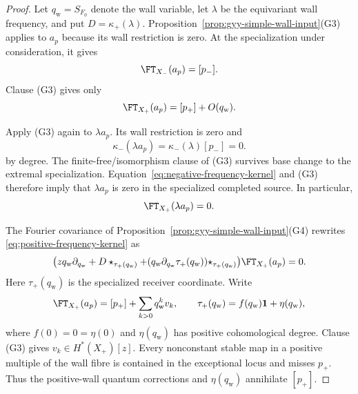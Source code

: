 \begin{proof}
Let \(q_{\mathrm w}=S_{F_0}\) denote the wall variable, let \(\lambda\) be the
equivariant wall frequency, and put \(D=\kappa_+(\lambda)\).
Proposition~\ref{prop:gyy-simple-wall-input}\textup{(G3)} applies to \(a_p\)
because its wall restriction is zero.  At the specialization under
consideration, it gives
\begin{equation}\label{eq:negative-fourier-point}
 \FT_{X_-}(a_p)=[p_-].
\end{equation}
Clause \textup{(G3)} gives only
\begin{equation}\label{eq:positive-fourier-point-tail}
 \FT_{X_+}(a_p)=[p_+]+O(q_{\mathrm w}).
\end{equation}

Apply \textup{(G3)} again to \(\lambda a_p\). Its wall restriction is zero and
\begin{equation}\label{eq:negative-frequency-kernel}
 \kappa_-(\lambda a_p)=\kappa_-(\lambda)[p_-]=0.
\end{equation}
by degree.  The finite-free/isomorphism clause of \textup{(G3)} survives base
change to the extremal specialization.
Equation~\eqref{eq:negative-frequency-kernel} and \textup{(G3)} therefore imply
that \(\lambda a_p\) is zero in the specialized completed source.  In
particular,
\begin{equation}\label{eq:positive-frequency-kernel}
 \FT_{X_+}(\lambda a_p)=0.
\end{equation}

The Fourier covariance of
Proposition~\ref{prop:gyy-simple-wall-input}\textup{(G4)} rewrites
\eqref{eq:positive-frequency-kernel} as
\begin{equation}\label{eq:positive-fourier-connection}
 \bigl(zq_{\mathrm w}\partial_{q_{\mathrm w}}+D\star_{\tau_+(q_{\mathrm w})}
 +(q_{\mathrm w}\partial_{q_{\mathrm w}}\tau_+(q_{\mathrm w}))
   \star_{\tau_+(q_{\mathrm w})}\bigr)
 \FT_{X_+}(a_p)=0.
\end{equation}
Here \(\tau_+(q_{\mathrm w})\) is the specialized receiver coordinate.  Write
\begin{equation}\label{eq:point-tail-expansions}
 \FT_{X_+}(a_p)=[p_+]+\sum_{k>0}q_{\mathrm w}^kv_k,
 \qquad
 \tau_+(q_{\mathrm w})=f(q_{\mathrm w})\mathbf1+\eta(q_{\mathrm w}),
\end{equation}
where \(f(0)=0=\eta(0)\) and \(\eta(q_{\mathrm w})\) has positive
cohomological degree.
Clause \textup{(G3)} gives \(v_k\in H^*(X_+)[z]\). Every nonconstant stable map in a
positive multiple of the wall fibre is contained in the exceptional locus
and misses \(p_+\).  Thus the positive-wall quantum corrections and
\(\eta(q_{\mathrm w})\) annihilate \([p_+]\).


\end{proof}
